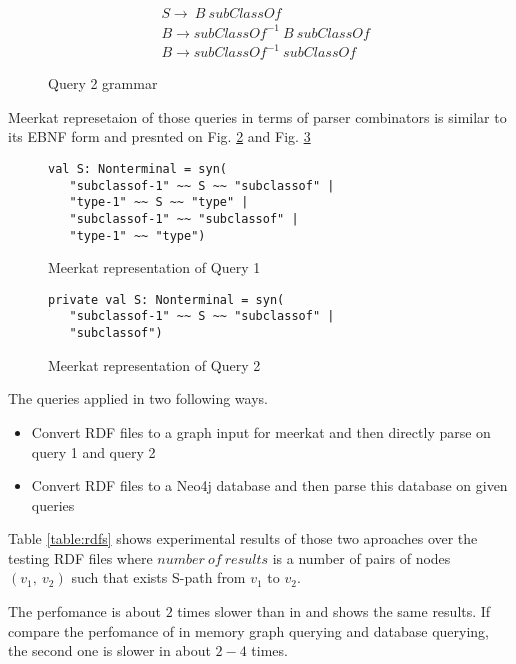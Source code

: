 \begin{figure}[h]
\begin{align*}
& S \rightarrow\ B\ subClassOf\\
& B \rightarrow subClassOf^{-1}\ B\ subClassOf\\
& B \rightarrow subClassOf^{-1}\ subClassOf
\end{align*}
\caption{Query 2 grammar}
\label{fig:query2}
\end{figure}

Meerkat represetaion of those queries in terms of parser combinators is similar to its EBNF form and presnted on Fig. \ref{fig:query1Meerkat} and Fig. \ref{fig:query2Meerkat}

\begin{figure}[h]
\begin{lstlisting}
val S: Nonterminal = syn(
   "subclassof-1" ~~ S ~~ "subclassof" |
   "type-1" ~~ S ~~ "type" |
   "subclassof-1" ~~ "subclassof" |
   "type-1" ~~ "type")
\end{lstlisting}
\caption{Meerkat representation of Query 1}
\label{fig:query1Meerkat}
\end{figure}

\begin{figure}[h]
\begin{lstlisting}
private val S: Nonterminal = syn(
   "subclassof-1" ~~ S ~~ "subclassof" |
   "subclassof")
\end{lstlisting}
\caption{Meerkat representation of Query 2}
\label{fig:query2Meerkat}
\end{figure}

The queries applied in two following ways.
\begin{itemize}
	\item Convert RDF files to a graph input for meerkat and then directly parse on query 1 and query 2
	\item Convert RDF files to a Neo4j database and then parse this database on given queries
\end{itemize} 
Table \ref{table:rdfs} shows experimental results of those two aproaches over the testing RDF files where $number\ of\ results$ is a number of pairs of nodes $(v_1,\ v_2)$ such that exists S-path from $v_1$ to $v_2$.

The perfomance is about $2$ times slower than in \cite{GrigorevR16} and shows the same results. If compare the perfomance of in memory graph querying and database querying, the second one is slower in about $2-4$ times.






